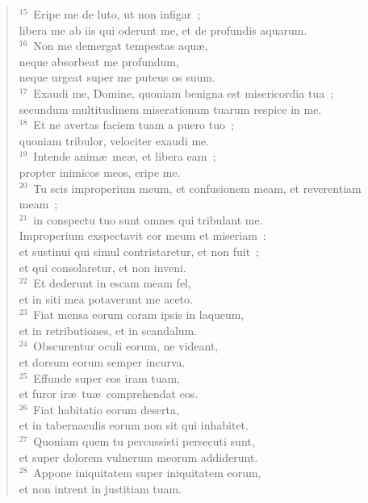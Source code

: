 \begin{flushleft}
\begin{verse}
${}^{15}$~Eripe me de luto, ut non infigar~;\\ libera me ab iis qui oderunt me, et de profundis aquarum.\\
${}^{16}$~Non me demergat tempestas aqu\ae ,\\ neque absorbeat me profundum,\\ neque urgeat super me puteus os suum.\\
${}^{17}$~Exaudi me, Domine, quoniam benigna est misericordia tua~;\\ secundum multitudinem miserationum tuarum respice in me.\\
${}^{18}$~Et ne avertas faciem tuam a puero tuo~;\\ quoniam tribulor, velociter exaudi me.\\
${}^{19}$~Intende anim\ae\ me\ae , et libera eam~;\\ propter inimicos meos, eripe me.\\
${}^{20}$~Tu scis improperium meum, et confusionem meam, et reverentiam meam~;\\
${}^{21}$~in conspectu tuo sunt omnes qui tribulant me.\\ Improperium exspectavit cor meum et miseriam~:\\ et sustinui qui simul contristaretur, et non fuit~;\\ et qui consolaretur, et non inveni.\\
${}^{22}$~Et dederunt in escam meam fel,\\ et in siti mea potaverunt me aceto.\\
${}^{23}$~Fiat mensa eorum coram ipsis in laqueum,\\ et in retributiones, et in scandalum.\\
${}^{24}$~Obscurentur oculi eorum, ne videant,\\ et dorsum eorum semper incurva.\\
${}^{25}$~Effunde super eos iram tuam,\\ et furor ir\ae\ tu\ae\ comprehendat eos.\\
${}^{26}$~Fiat habitatio eorum deserta,\\ et in tabernaculis eorum non sit qui inhabitet.\\
${}^{27}$~Quoniam quem tu percussisti persecuti sunt,\\ et super dolorem vulnerum meorum addiderunt.\\
${}^{28}$~Appone iniquitatem super iniquitatem eorum,\\ et non intrent in justitiam tuam.\\

\end{verse}
\end{flushleft}
